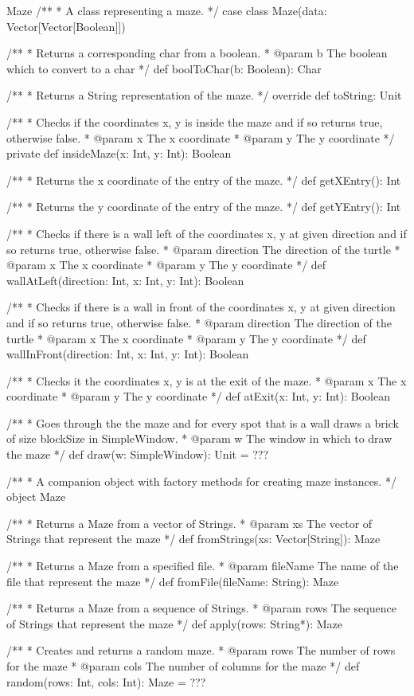 \begin{ScalaSpec}{Maze}
/**
 *  A class representing a maze.
 */
case class Maze(data: Vector[Vector[Boolean]]) {
  
  /**
   *  Returns a corresponding char from a boolean.
   *  @param b	The boolean which to convert to a char
   */
  def boolToChar(b: Boolean): Char

  /**
   *  Returns a String representation of the maze.
   */
  override def toString: Unit

  /**
   *  Checks if the coordinates x, y is inside the maze and if 
   so returns true, otherwise false.
   *  @param x		The x coordinate
   *  @param y		The y coordinate
   */
  private def insideMaze(x: Int, y: Int): Boolean

  /**
   *  Returns the x coordinate of the entry of the maze.
   */
  def getXEntry(): Int

  /**
   * Returns the y coordinate of the entry of the maze.
   */
  def getYEntry(): Int

  /**
   *  Checks if there is a wall left of the coordinates x, y at 
   given direction and if so returns true, otherwise false.
   *  @param direction	The direction of the turtle
   *  @param x					The x coordinate
   *  @param y					The y coordinate
   */
  def wallAtLeft(direction: Int, x: Int, y: Int): Boolean

  /**
   *  Checks if there is a wall in front of the coordinates x, y at 
   given direction and if so returns true, otherwise false.
   *  @param direction	The direction of the turtle
   *  @param x					The x coordinate
   *  @param y					The y coordinate
   */
  def wallInFront(direction: Int, x: Int, y: Int): Boolean

  /**
   *  Checks it the coordinates x, y is at the exit of the maze.
   *  @param x					The x coordinate
   *  @param y					The y coordinate
   */
  def atExit(x: Int, y: Int): Boolean

  /**
   *  Goes through the the maze and for every spot that is a wall 
   draws a brick of size blockSize in SimpleWindow.
   *  @param w		The window in which to draw the maze
   */
  def draw(w: SimpleWindow): Unit = ???
}

/**
 *  A companion object with factory methods for creating maze instances.
 */
object Maze {

  /**
   *  Returns a Maze from a vector of Strings.
   *  @param xs	The vector of Strings that represent the maze
   */
  def fromStrings(xs: Vector[String]): Maze

  /**
   *  Returns a Maze from a specified file.
   *  @param fileName	   The name of the file that represent the maze
   */
  def fromFile(fileName: String): Maze

  /**
   *  Returns a Maze from a sequence of Strings.
   *  @param rows	The sequence of Strings that represent the maze
   */
  def apply(rows: String*): Maze

  /**
   *  Creates and returns a random maze.
   *  @param rows		The number of rows for the maze
   *  @param cols		The number of columns for the maze
   */
  def random(rows: Int, cols: Int): Maze = ???
}

\end{ScalaSpec}


